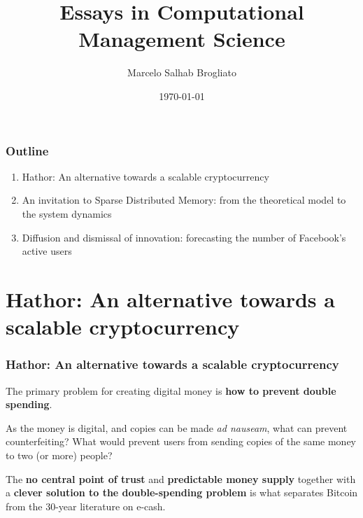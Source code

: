\documentclass{beamer}
\title{Essays in Computational Management Science}
\author{Marcelo Salhab Brogliato}
\institute{EBAPE / FGV}
\date{\today}
\begin{document}
\begin{frame}
\titlepage
\end{frame}


%
%
%


\begin{frame}
\frametitle{Outline}
\begin{enumerate}[I]
\item Hathor: An alternative towards a scalable cryptocurrency
\item An invitation to Sparse Distributed Memory: from the theoretical model to the system dynamics
\item Diffusion and dismissal of innovation: forecasting the number of Facebook’s active users
\end{enumerate}
\end{frame}


\section{Hathor: An alternative towards a scalable cryptocurrency}
\begin{frame}
\sectionpage
\end{frame}


\begin{frame}
\frametitle{Hathor: An alternative towards a scalable cryptocurrency}

The primary problem for creating digital money is \textbf{how to prevent double spending}.

As the money is digital, and copies can be made \emph{ad nauseam}, what can prevent counterfeiting? What would prevent users from sending copies of the same money to two (or more) people?

The \textbf{no central point of trust} and \textbf{predictable money supply} together with a \textbf{clever solution to the double-spending problem} is what separates Bitcoin from the 30-year literature on e-cash.

\end{frame}
\end{document}
